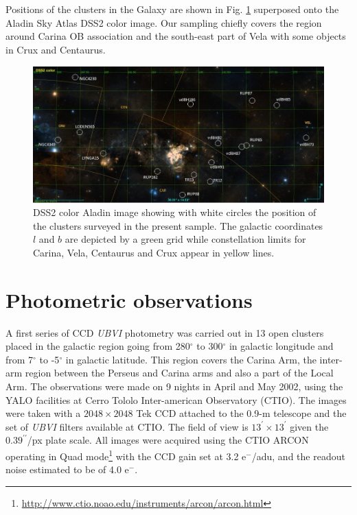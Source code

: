 \documentclass[draft]{aa}
\begin{document}
Positions of the clusters in the Galaxy are shown in Fig. \ref{fig1} superposed
onto the Aladin Sky Atlas DSS2 color image. Our sampling chiefly covers the
region around Carina OB association and the south-east part of Vela with some
objects in Crux and Centaurus.

\begin{figure}[ht]
    \centering
    \includegraphics[width=\hsize]{../figs/DSS2color.png}
    \caption{DSS2 color Aladin image showing with white circles the position of
    the clusters surveyed in the present sample. The galactic coordinates $l$
    and $b$ are depicted by a green grid while constellation limits for Carina,
    Vela, Centaurus and Crux appear in yellow lines.}
    \label{fig1}
\end{figure}




\section{Photometric observations}
\label{sec:photo_obs}

A first series of CCD \emph{UBVI} photometry was carried out in 13 open clusters
placed in the galactic region going from 280$^\circ$ to 300$^\circ$ in galactic
longitude and from 7$^\circ$ to -5$^\circ$ in galactic latitude. This region
covers the Carina Arm, the inter-arm region between the Perseus and Carina arms
and also a part of the Local Arm.
%
The observations were made on 9 nights in April and May 2002, using the YALO
facilities at Cerro Tololo Inter-american Observatory (CTIO). The images were
taken with a $2048\times2048$ Tek CCD attached to the 0.9-m telescope and the
set of \textit{UBVI} filters available at CTIO. The field of view is
$13^\prime\times13^\prime$ given the $0.39^{\prime\prime}$/px plate scale.
All images were acquired using the CTIO ARCON operating in Quad
mode\footnote{\url{http://www.ctio.noao.edu/instruments/arcon/arcon.html}} with
the CCD gain set at 3.2 e$^-$/adu, and the readout noise estimated to be of
4.0 e$^-$.
\end{document}
